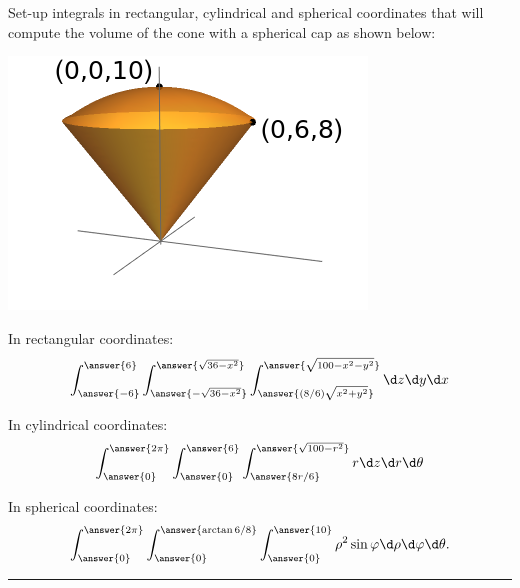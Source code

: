 \documentclass{ximera}
\author{Bart Snapp}
\begin{document}
Set-up integrals in rectangular, cylindrical and spherical coordinates
that will compute the volume of the cone with a spherical cap as shown below:
\begin{image}
  \includegraphics{coneWithCap6-8-10.png}
\end{image}

\begin{problem}
  In rectangular coordinates:
  \[
  \int_{\answer{-6}}^{\answer{6}} \int_{\answer{-\sqrt{36-x^2}}}^{\answer{\sqrt{36-x^2}}} \int_{\answer{(8/6)\sqrt{x^2+y^2}}}^{\answer{\sqrt{100-x^2-y^2}}} \d z \d y \d x
  \]
\end{problem}

\begin{problem}
  In cylindrical coordinates:
  \[
  \int_{\answer{0}}^{\answer{2\pi}} \int_{\answer{0}}^{\answer{6}} \int_{\answer{8r/6}}^{\answer{\sqrt{100-r^2}}} r \d z \d r \d \theta
  \]
\end{problem}


\begin{problem}
  In spherical coordinates:
  \[
  \int_{\answer{0}}^{\answer{2\pi}} \int_{\answer{0}}^{\answer{\arctan{6/8}}} \int_{\answer{0}}^{\answer{10}} \rho^2 \sin \varphi \d \rho \d \varphi \d\theta.
  \]
\end{problem}

\vfill

\hrule

\begin{problem}
  \begin{selectAll}




  \end{selectAll}
\end{problem}
\end{document}
